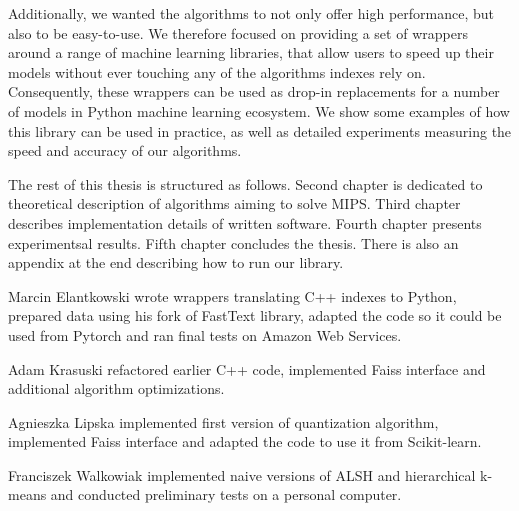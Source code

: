 Additionally, we wanted the algorithms to not only offer high performance, but also to be easy-to-use. We therefore
focused on providing a set of wrappers around a range of machine learning libraries, that allow users to 
speed up their models without ever touching any of the algorithms indexes rely on. Consequently,
these wrappers can be used as drop-in replacements for a number of models in Python machine learning ecosystem.
We show some examples of how this library can be used in practice,
as well as detailed experiments measuring the speed and accuracy of our algorithms.

The rest of this thesis is structured as follows.
Second chapter is dedicated to theoretical description of algorithms aiming to solve MIPS.
Third chapter describes implementation details of written software.
Fourth chapter presents experimentsal results.
Fifth chapter concludes the thesis.
There is also an appendix at the end describing how to run our library.

Marcin Elantkowski wrote wrappers translating C++ indexes to Python, prepared data using his fork of FastText
library, adapted the code so it could be used from Pytorch and ran final tests on Amazon Web Services.

Adam Krasuski refactored earlier C++ code, implemented Faiss interface and additional algorithm optimizations.

Agnieszka Lipska implemented first version of quantization algorithm, implemented Faiss interface and
adapted the code to use it from Scikit-learn.

Franciszek Walkowiak implemented naive versions of ALSH and hierarchical \mbox{k-means} and conducted 
preliminary tests on a personal computer.

